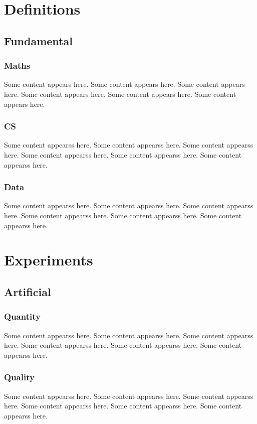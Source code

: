 
\chapter{Definitions}
\label{app:definitions}

\section{Fundamental}
\subsection{Maths} 
\label{Fundamental:Maths}

Some content appears here. Some content appears here. Some content appears here. Some content appears here. Some content appears here. Some content appears here. 

\subsection{CS} 
\label{Fundamental:CS}
Some content appearss here. Some content appearss here. Some content appearss here. Some content appearss here. Some content appearss here. Some content appearss here. 

\subsection{Data} 
\label{Fundamental:Data}
Some content appearss here. Some content appearss here. Some content appearss here. Some content appearss here. Some content appearss here. Some content appearss here. 


\chapter{Experiments}

\section{Artificial}
\subsection{Quantity} 
\label{Artificial:Quantity}

Some content appearss here. Some content appearss here. Some content appearss here. Some content appearss here. Some content appearss here. Some content appearss here. 

\subsection{Quality} 
\label{Artificial:Quality}
Some content appearss here. Some content appearss here. Some content appearss here. Some content appearss here. Some content appearss here. Some content appearss here. 

